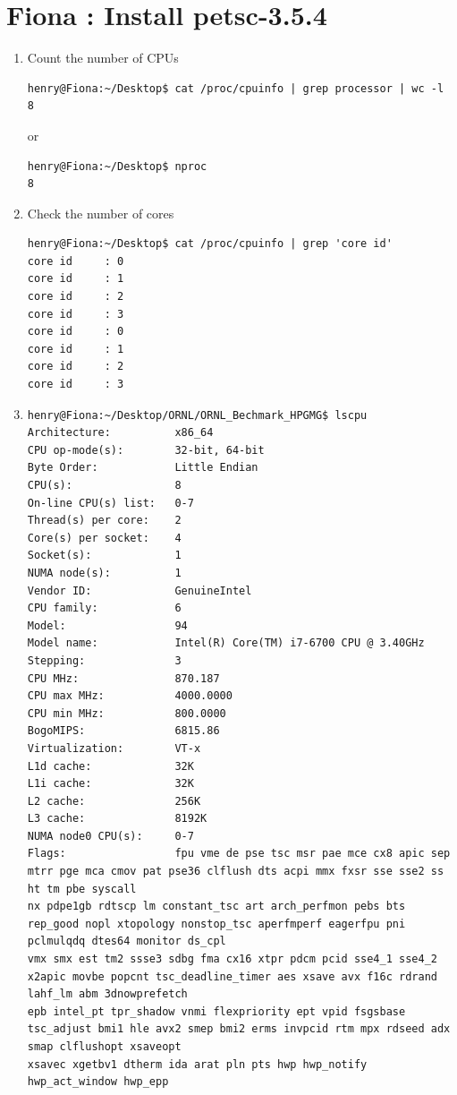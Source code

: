 \documentclass{article}
\begin{document}
\section{Fiona : Install petsc-3.5.4}
\begin{enumerate}
\item Count the number of CPUs
\tiny
\begin{verbatim}
henry@Fiona:~/Desktop$ cat /proc/cpuinfo | grep processor | wc -l
8 
\end{verbatim}
\normalsize
or
\tiny
\begin{verbatim}
henry@Fiona:~/Desktop$ nproc
8
\end{verbatim}
\normalsize
\item Check the number of cores
\tiny
\begin{verbatim}
henry@Fiona:~/Desktop$ cat /proc/cpuinfo | grep 'core id'
core id		: 0
core id		: 1
core id		: 2
core id		: 3
core id		: 0
core id		: 1
core id		: 2
core id		: 3  
\end{verbatim}
\normalsize
\item 
\tiny
\begin{verbatim}
henry@Fiona:~/Desktop/ORNL/ORNL_Bechmark_HPGMG$ lscpu
Architecture:          x86_64
CPU op-mode(s):        32-bit, 64-bit
Byte Order:            Little Endian
CPU(s):                8
On-line CPU(s) list:   0-7
Thread(s) per core:    2
Core(s) per socket:    4
Socket(s):             1
NUMA node(s):          1
Vendor ID:             GenuineIntel
CPU family:            6
Model:                 94
Model name:            Intel(R) Core(TM) i7-6700 CPU @ 3.40GHz
Stepping:              3
CPU MHz:               870.187
CPU max MHz:           4000.0000
CPU min MHz:           800.0000
BogoMIPS:              6815.86
Virtualization:        VT-x
L1d cache:             32K
L1i cache:             32K
L2 cache:              256K
L3 cache:              8192K
NUMA node0 CPU(s):     0-7
Flags:                 fpu vme de pse tsc msr pae mce cx8 apic sep mtrr pge mca cmov pat pse36 clflush dts acpi mmx fxsr sse sse2 ss ht tm pbe syscall
nx pdpe1gb rdtscp lm constant_tsc art arch_perfmon pebs bts rep_good nopl xtopology nonstop_tsc aperfmperf eagerfpu pni pclmulqdq dtes64 monitor ds_cpl
vmx smx est tm2 ssse3 sdbg fma cx16 xtpr pdcm pcid sse4_1 sse4_2 x2apic movbe popcnt tsc_deadline_timer aes xsave avx f16c rdrand lahf_lm abm 3dnowprefetch
epb intel_pt tpr_shadow vnmi flexpriority ept vpid fsgsbase tsc_adjust bmi1 hle avx2 smep bmi2 erms invpcid rtm mpx rdseed adx smap clflushopt xsaveopt
xsavec xgetbv1 dtherm ida arat pln pts hwp hwp_notify hwp_act_window hwp_epp

\end{verbatim}
\end{enumerate}
\end{document}
